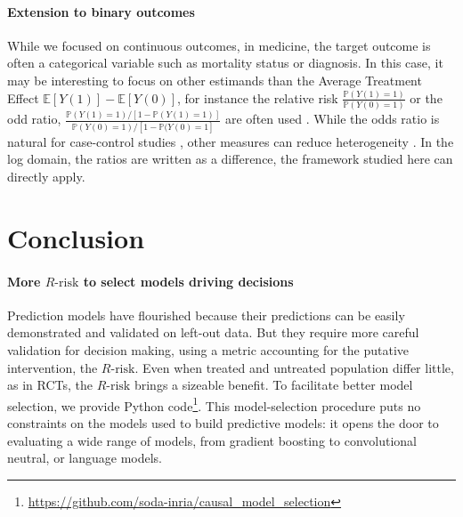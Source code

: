 \documentclass[11pt]{article}
\let\cite=\supercite
\begin{document}
\paragraph{Extension to binary outcomes}
While we focused on continuous outcomes, in medicine, the target outcome
is often a categorical variable such as mortality status or diagnosis. In
this case, it may be interesting to focus on other estimands than the
Average Treatment Effect $\mathbb{E}[Y(1)] -\mathbb{E}[Y(0)] $, for instance the relative risk
$\frac{\mathbb P(Y(1) = 1)}{\mathbb P(Y(0) = 1)}$
or the odd ratio, $\frac{\mathbb P(Y(1) = 1) / [1 - \mathbb P(Y(1)
    =1)]}{\mathbb P(Y(0) = 1) / [1 - \mathbb P(Y(0) = 1]}$ are often used
\cite{austin2017estimating}. While the odds ratio is natural for
case-control studies \cite{rothman2008case}, other measures
can reduce heterogeneity \cite{colnet2023risk}.
In the log domain, the ratios are written as a difference, the
framework studied here can directly apply.

\section{Conclusion}\label{sec:conclusion}
\paragraph{More $R\text{-risk}$ to select models driving decisions}

Prediction models have flourished because their predictions can be easily
demonstrated and validated on left-out data. But they require more
careful validation for decision making, using a metric accounting for the
putative intervention, the $R\text{-risk}$. Even when treated and
untreated population differ little, as in RCTs, the $R\text{-risk}$
brings a sizeable benefit. To facilitate better model selection, we provide Python
code\footnote{\url{https://github.com/soda-inria/causal_model_selection}}.
This model-selection procedure puts no constraints on the models used to
build predictive models: it opens the door to evaluating a wide range of
models, from gradient boosting to convolutional neutral, or language
models.
\end{document}
